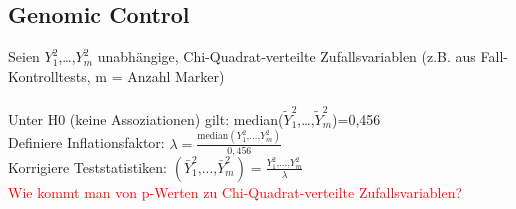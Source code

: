 \subsection{Genomic Control}
Seien $Y_1^2$,…,$Y_m^2$ unabhängige, Chi-Quadrat-verteilte Zufallsvariablen (z.B. aus Fall-Kontrolltests, m = Anzahl Marker)\\\\
Unter H0 (keine Assoziationen) gilt: median($\tilde{Y}_1^2$,…,$\tilde{Y}_m^2$)=0,456\\
Definiere Inflationsfaktor: $\lambda=\frac{\text{median}(Y_1^2\text{,...,}Y_m^2)}{0,456}$\\
Korrigiere Teststatistiken: $(\bar{Y}_1^2\text{,...,}\bar{Y}_m^2) = \frac{Y_1^2\text{,...,}Y_m^2}{\lambda}$\\
\textcolor{red}{Wie kommt man von p-Werten zu Chi-Quadrat-verteilte Zufallsvariablen?}